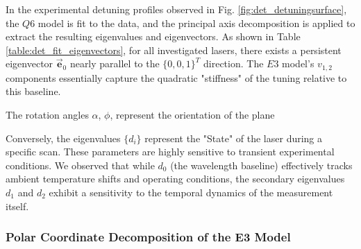 \documentclass[12pt]{report}
\begin{document}
	In the experimental detuning profiles observed in Fig. \ref{fig:det_detuningsurface}, the $Q6$ model is fit to the data, and the principal axis decomposition is applied to extract the resulting eigenvalues and eigenvectors. As shown in Table \ref{table:det_fit_eigenvectors}, for all investigated lasers, there exists a persistent eigenvector $\vec{\mathbf{e}}_0$ nearly parallel to the $\{0, 0, 1\}^T$ direction. The $E3$ model's $v_{1,2}$ components essentially capture the quadratic "stiffness" of the tuning relative to this baseline.
	
	
	
	The rotation angles $\alpha$, $\phi$, represent the orientation of the plane
	
	Conversely, the eigenvalues $\{d_i\}$ represent the "State" of the laser during a specific scan. These parameters are highly sensitive to transient experimental conditions. We observed that while $d_0$ (the wavelength baseline) effectively tracks ambient temperature shifts and operating conditions, the secondary eigenvalues $d_1$ and $d_2$ exhibit a sensitivity to the temporal dynamics of the measurement itself.
	
	\subsubsection{Polar Coordinate Decomposition of the E3 Model}
	
\end{document}
